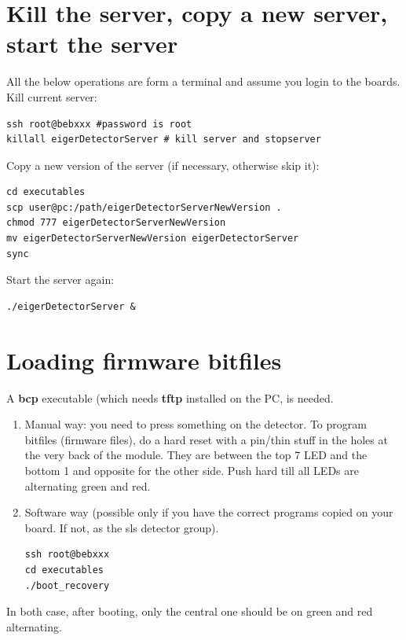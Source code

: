 \documentclass{article}
\begin{document}
\appendix

\section{Kill the server, copy a new server, start the server}\label{server}
All the below operations are form a terminal and assume you login to the boards.\\
Kill current server:
\begin{verbatim}
ssh root@bebxxx #password is root
killall eigerDetectorServer # kill server and stopserver
\end{verbatim}
Copy a new version of the server (if necessary, otherwise skip it):
\begin{verbatim}
cd executables
scp user@pc:/path/eigerDetectorServerNewVersion .
chmod 777 eigerDetectorServerNewVersion
mv eigerDetectorServerNewVersion eigerDetectorServer
sync
\end{verbatim}
Start the server again:
\begin{verbatim}
./eigerDetectorServer &
\end{verbatim}


\section{Loading firmware bitfiles}

A \textbf{bcp} executable (which needs \textbf{tftp} installed on the PC, is needed. 
\begin{enumerate}
\item Manual way: you need to press something on the detector. To program bitfiles (firmware files), do a hard reset with a pin/thin stuff in the holes at the very back of the module. They are between the top 7 LED and the bottom 1 and opposite for the other side. Push hard till all LEDs are alternating green and red.
\item Software way (possible only if you have the correct programs copied on your board. If not, as the sls detector group). 
\begin{verbatim}
ssh root@bebxxx
cd executables
./boot_recovery 
 \end{verbatim} 
\end{enumerate}
In both case, after booting, only the central one should be on green and red alternating. 
\end{document}

